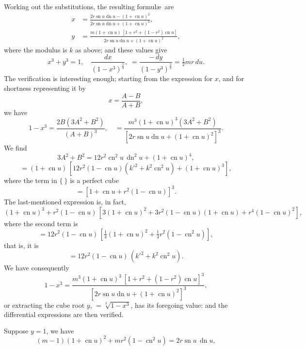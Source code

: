 \documentclass[11pt,a4paper]{article}
\begin{document}
\thispagestyle{plain}
\noindent Working out the substitutions, the resulting formul\ae\ are
\[
\begin{aligned}
x &= \frac{2r\operatorname{sn} u \operatorname{dn} u - (1 + \operatorname{cn} u)^{2}}{2r\operatorname{sn} u \operatorname{dn} u + (1 + \operatorname{cn} u)^{2}},\\[4pt]
y &= \frac{m(1 + \operatorname{cn} u)\,[1 + r^{2} + (1 - r^{2})\operatorname{cn} u]}{2r\operatorname{sn} u \operatorname{dn} u + (1 + \operatorname{cn} u)^{2}},
\end{aligned}
\]
where the modulus is $k$ as above; and these values give
\[
x^{3} + y^{3} = 1,\quad \frac{dx}{(1 - x^{3})^{\frac{2}{3}}},\; = \frac{-\,dy}{(1 - y^{3})^{\frac{2}{3}}} = \tfrac{1}{2}mr\,du.
\]
The verification is interesting enough; starting from the expression for $x$, and for shortness representing it by
\[
x = \frac{A - B}{A + B},
\]
we have
\[
1 - x^{3} = \frac{2B(3A^{2} + B^{2})}{(A + B)^{3}},\quad = \frac{m^{3}(1 + \operatorname{cn} u)^{3}(3A^{2} + B^{2})}{[2r\operatorname{sn} u \operatorname{dn} u + (1 + \operatorname{cn} u)^{2}]^{3}}.
\]
We find
\[
3A^{2} + B^{2} = 12r^{2}\operatorname{cn}^{2} u\,\operatorname{dn}^{2} u + (1 + \operatorname{cn} u)^{4},
\]
\[
= (1 + \operatorname{cn} u)\,[12r^{2}(1 - \operatorname{cn} u)(k'^{2} + k^{2}\operatorname{cn}^{2} u) + (1 + \operatorname{cn} u)^{3}],
\]
where the term in $\{\ \}$ is a perfect cube
\[
= [1 + \operatorname{cn} u + r^{2}(1 - \operatorname{cn} u)]^{3}.
\]
The last-mentioned expression is, in fact,
\[
(1 + \operatorname{cn} u)^{3} + r^{2}(1 - \operatorname{cn} u)\,[3(1 + \operatorname{cn} u)^{2} + 3r^{2}(1 - \operatorname{cn} u)(1 + \operatorname{cn} u) + r^{4}(1 - \operatorname{cn} u)^{2}],
\]
where the second term is
\[
= 12r^{2}(1 - \operatorname{cn} u)\,[\tfrac{1}{4}(1 + \operatorname{cn} u)^{2} + \tfrac{1}{4}r^{2}(1 - \operatorname{cn}^{2} u)],
\]
that is, it is
\[
= 12r^{2}(1 - \operatorname{cn} u)\,(k'^{2} + k^{2}\operatorname{cn}^{2} u).
\]
We have consequently
\[
1 - x^{3} = \frac{m^{3}(1 + \operatorname{cn} u)^{3}\,[1 + r^{2} + (1 - r^{2})\operatorname{cn} u]^{3}}{[2r\operatorname{sn} u \operatorname{dn} u + (1 + \operatorname{cn} u)^{2}]^{3}},
\]
or extracting the cube root $y$, $= \sqrt[3]{1 - x^{3}}$, has its foregoing value: and the differential expressions are then verified.

\medskip
Suppose $y = 1$, we have
\[
(m - 1)(1 + \operatorname{cn} u)^{2} + mr^{2}(1 - \operatorname{cn}^{2} u) = 2r\operatorname{sn} u\,\operatorname{dn} u,
\]
\clearpage
\end{document}
